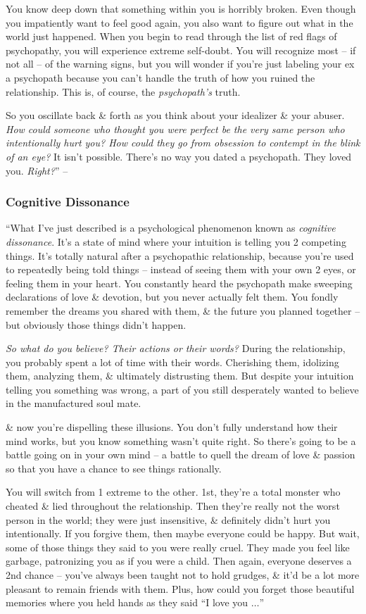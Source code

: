 \documentclass{article}
\numberwithin{equation}{section}
\begin{document}
You know deep down that something within you is horribly broken. Even though you impatiently want to feel good again, you also want to figure out what in the world just happened. When you begin to read through the list of red flags of psychopathy, you will experience extreme self-doubt. You will recognize most -- if not all -- of the warning signs, but you will wonder if you're just labeling your ex a psychopath because you can't handle the truth of how you ruined the relationship. This is, of course, the \textit{psychopath's} truth.

So you oscillate back \& forth as you think about your idealizer \& your abuser. \textit{How could someone who thought you were perfect be the very same person who intentionally hurt you? How could they go from obsession to contempt in the blink of an eye?} It isn't possible. There's no way you dated a psychopath. They loved you. \textit{Right?}'' -- \cite[pp. 99--100]{MacKenzie2015}

\subsubsection{Cognitive Dissonance}
``What I've just described is a psychological phenomenon known as \textit{cognitive dissonance}. It's a state of mind where your intuition is telling you 2 competing things. It's totally natural after a psychopathic relationship, because you're used to repeatedly being told things -- instead of seeing them with your own 2 eyes, or feeling them in your heart. You constantly heard the psychopath make sweeping declarations of love \& devotion, but you never actually felt them. You fondly remember the dreams you shared with them, \& the future you planned together -- but obviously those things didn't happen.

\textit{So what do you believe? Their actions or their words?} During the relationship, you probably spent a lot of time with their words. Cherishing them, idolizing them, analyzing them, \& ultimately distrusting them. But despite your intuition telling you something was wrong, a part of you still desperately wanted to believe in the manufactured soul mate.

\& now you're dispelling these illusions. You don't fully understand how their mind works, but you know something wasn't quite right. So there's going to be a battle going on in your own mind -- a battle to quell the dream of love \& passion so that you have a chance to see things rationally.

You will switch from 1 extreme to the other. 1st, they're a total monster who cheated \& lied throughout the relationship. Then they're really not the worst person in the world; they were just insensitive, \& definitely didn't hurt you intentionally. If you forgive them, then maybe everyone could be happy. But wait, some of those things they said to you were really cruel. They made you feel like garbage, patronizing you as if you were a child. Then again, everyone deserves a 2nd chance -- you've always been taught not to hold grudges, \& it'd be a lot more pleasant to remain friends with them. Plus, how could you forget those beautiful memories where you held hands as they said ``I love you $\ldots$''
\end{document}
